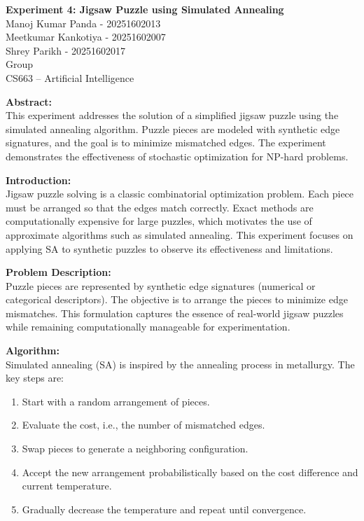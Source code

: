 \documentclass[a4paper,12pt]{article}  %
\begin{document}
\begin{center}
\LARGE \textbf{Experiment 4: Jigsaw Puzzle using Simulated Annealing} \\[5mm]
\large
Manoj Kumar Panda - 20251602013 \\
Meetkumar Kankotiya - 20251602007 \\
Shrey Parikh - 20251602017 \\
Group \\ CS663 -- Artificial Intelligence
\end{center}

\vspace{5mm}

\noindent \textbf{Abstract:} \\
This experiment addresses the solution of a simplified jigsaw puzzle using the simulated annealing algorithm. Puzzle pieces are modeled with synthetic edge signatures, and the goal is to minimize mismatched edges. The experiment demonstrates the effectiveness of stochastic optimization for NP-hard problems.

\vspace{3mm}
\noindent \textbf{Introduction:} \\
Jigsaw puzzle solving is a classic combinatorial optimization problem. Each piece must be arranged so that the edges match correctly. Exact methods are computationally expensive for large puzzles, which motivates the use of approximate algorithms such as simulated annealing. This experiment focuses on applying SA to synthetic puzzles to observe its effectiveness and limitations.

\vspace{3mm}
\noindent \textbf{Problem Description:} \\
Puzzle pieces are represented by synthetic edge signatures (numerical or categorical descriptors). The objective is to arrange the pieces to minimize edge mismatches. This formulation captures the essence of real-world jigsaw puzzles while remaining computationally manageable for experimentation.

\vspace{3mm}
\noindent \textbf{Algorithm:} \\
Simulated annealing (SA) is inspired by the annealing process in metallurgy. The key steps are:
\begin{enumerate}
    \item Start with a random arrangement of pieces.
    \item Evaluate the cost, i.e., the number of mismatched edges.
    \item Swap pieces to generate a neighboring configuration.
    \item Accept the new arrangement probabilistically based on the cost difference and current temperature.
    \item Gradually decrease the temperature and repeat until convergence.
\end{enumerate}
\end{document}
